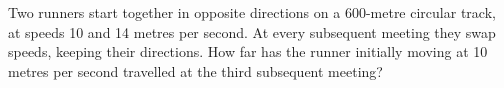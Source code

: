 Two runners start together in opposite directions on a 600-metre circular track, at speeds 10 and 14 metres per second. At every subsequent meeting they swap speeds, keeping their directions. How far has the runner initially moving at 10 metres per second travelled at the third subsequent meeting?

